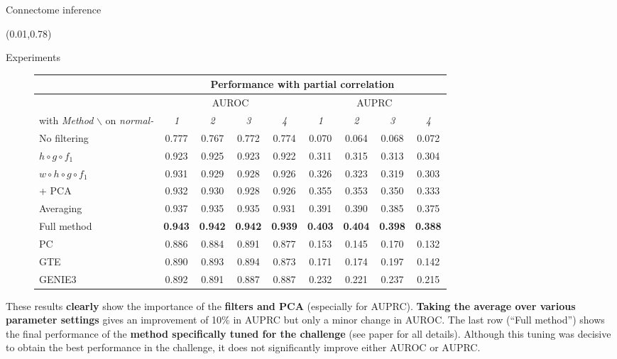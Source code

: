 \documentclass[final]{beamer}
\begin{document}
\begin{frame}{}
\begin{textblock}{0.485}
\begin{block}{Connectome inference \phantom{p}}
\end{block}

\end{textblock}


\begin{textblock}{0.74}(0.01,0.78)

\begin{block}{Experiments \phantom{p}}

\vspace{-5pt}
\begin{figure}
\centering
\tiny
\begin{tabular}{| l | c c c c | c c c c |}
\hline
& \multicolumn{8}{c|}{Performance with partial correlation}\\ \hline
& \multicolumn{4}{c|}{AUROC} & \multicolumn{4}{c|}{AUPRC} \\
with \textit{Method} $\backslash$ on \textit{normal-} & \textit{1} & \textit{2} & \textit{3} & \textit{4} & \textit{1} & \textit{2} & \textit{3} & \textit{4} \\
\hline
\hline
No  filtering       					& 0.777 & 0.767 & 0.772 & 0.774 & 0.070 & 0.064 & 0.068 & 0.072\\
$ h \circ g \circ f_1$                  & 0.923 & 0.925 & 0.923 & 0.922 & 0.311 & 0.315 & 0.313 & 0.304\\
$ w \circ h \circ g \circ f_1$          & 0.931 & 0.929 & 0.928 & 0.926 & 0.326 & 0.323 & 0.319 & 0.303\\
+ PCA         							& 0.932 & 0.930 & 0.928 & 0.926 & 0.355 & 0.353 & 0.350 & 0.333\\
Averaging           					& 0.937 & 0.935 & 0.935 & 0.931 & 0.391 &  0.390 &  0.385 & 0.375\\
Full method           					& \textbf{0.943} & \textbf{0.942} & \textbf{0.942} & \textbf{0.939} & \textbf{0.403} & \textbf{0.404} & \textbf{0.398} & \textbf{0.388}\\
\hline
PC & 0.886 & 0.884 & 0.891 &  0.877 & 0.153 & 0.145 & 0.170 & 0.132\\
GTE & 0.890 & 0.893 & 0.894 & 0.873 & 0.171 & 0.174 & 0.197 & 0.142\\
GENIE3 & 0.892 & 0.891 & 0.887 & 0.887 & 0.232 & 0.221 & 0.237 & 0.215 \\
\hline
\end{tabular}
\end{figure}

These results \textbf{clearly} show the importance of the \textbf{filters and PCA} (especially for AUPRC). \textbf{Taking the average over
various parameter settings} gives an improvement of 10\% in AUPRC but
only a minor change in AUROC. The last row (``Full method'') shows the
final performance of the \textbf{method specifically tuned for the challenge}
(see paper for all details). Although this
tuning was decisive to obtain the best performance in the challenge,
it does not significantly improve either AUROC or AUPRC.\\[1ex]


\end{block}
\end{textblock}
\end{frame}
\end{document}
